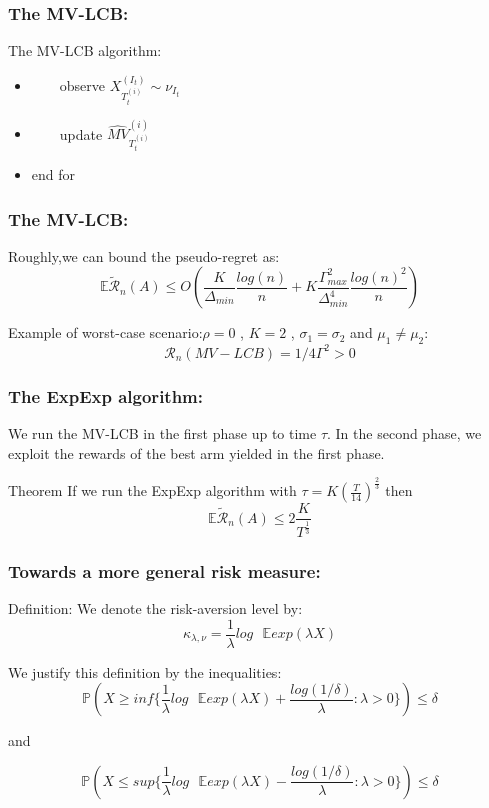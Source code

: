 \documentclass[english]{beamer}
\begin{document}
\begin{frame}
\frametitle{The MV-LCB:}
\begin{block}{The MV-LCB algorithm:}
\begin{itemize}

\item[8. \ ] \ \ \ \ observe $X^{(I_t)}_{T^{(i)}_{t}} \sim \nu_{I_t}$
\item[9. \ ] \ \ \ \ update $\widehat{MV}^{(i)}_{T^{(i)}_{t}}$
\item[10. \ ] end for
\end{itemize}

\end{block}
\end{frame}

\begin{frame}
\frametitle{The MV-LCB:}
Roughly,we can bound the pseudo-regret as:
$$\mathbb{E}\tilde{\mathscr{R}}_n(A)\leq O(\frac{K}{\Delta_{min}}\frac{log(n)}{n}+K\frac{\Gamma_{max}^2}{\Delta_{min}^4}\frac{log(n)^2}{n})$$

Example of worst-case scenario:$\rho=0$ , $K=2$ , $\sigma_1=\sigma_2$ and $\mu_1\neq \mu_2$:
$$\mathscr{R}_n(MV-LCB)=1/4\Gamma^2>0$$
\end{frame}

\begin{frame}
\frametitle{The ExpExp algorithm:}

We run the MV-LCB in the first phase up to time $\tau$. In the second phase, we exploit the rewards of the best arm yielded in the first phase.
\begin{block}{Theorem}
If we run the ExpExp algorithm with $\tau=K(\frac{T}{14})^{\frac{2}{3}}$ then $$\mathbb{E}\tilde{\mathscr{R}}_n(A)\leq 2 \frac{K}{T^{\frac{1}{3}}}$$
\end{block}
\end{frame}

\begin{frame}
\frametitle{Towards a more general risk measure:}
\begin{block}{Definition:}
We denote the risk-aversion level by:
$$\kappa_{\lambda,\nu}=\frac{1}{\lambda}log\text{\ }\mathbb{E}exp(\lambda X)$$
\end{block}
We justify this definition by the inequalities:
$$\mathbb{P}(X\geq inf\{\frac{1}{\lambda}log\text{\ }\mathbb{E}exp(\lambda X)+\frac{log(1/\delta)}{\lambda} : \lambda>0\})\leq \delta$$

and

$$\mathbb{P}(X\leq sup\{\frac{1}{\lambda}log\text{\ }\mathbb{E}exp(\lambda X)-\frac{log(1/\delta)}{\lambda} : \lambda>0\})\leq \delta$$
\end{frame}
\end{document}
